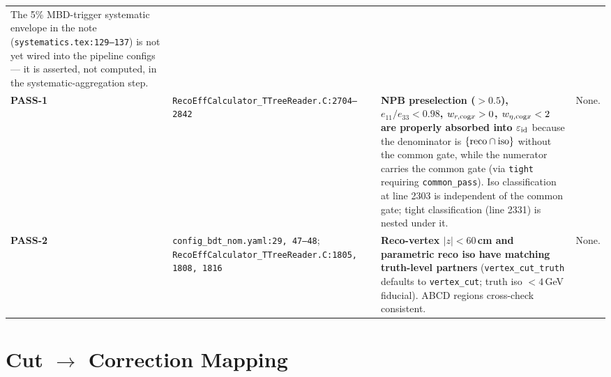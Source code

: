 \documentclass[11pt,a4paper]{article}
\newcommand{\ok}[1]{\textcolor{green!50!black}{\textbf{#1}}}
\begin{document}
\begin{longtable}{@{}p{1.9cm}p{4.8cm}p{5.8cm}p{4.3cm}@{}}
The 5\% MBD-trigger systematic envelope in the note
(\texttt{systematics.tex:129--137}) is not yet wired into the pipeline
configs --- it is asserted, not computed, in the systematic-aggregation
step. \\
\addlinespace
\ok{PASS-1} &
\texttt{RecoEffCalculator\_TTreeReader.C:2704--2842} &
\ok{NPB preselection ($> 0.5$), $e_{11}/e_{33} < 0.98$,
$w_{r,{\rm cog}x} > 0$, $w_{\eta,{\rm cog}x} < 2$ are properly absorbed
into $\varepsilon_{\rm id}$} because the denominator is
$\{{\rm reco} \cap {\rm iso}\}$ without the common gate, while the
numerator carries the common gate (via \texttt{tight} requiring
\texttt{common\_pass}). Iso classification at line 2303 is
independent of the common gate; tight classification (line 2331) is
nested under it. & None. \\
\addlinespace
\ok{PASS-2} &
\texttt{config\_bdt\_nom.yaml:29, 47--48}; \texttt{RecoEffCalculator\_TTreeReader.C:1805, 1808, 1816} &
\ok{Reco-vertex $|z|<60$\,cm and parametric reco iso have matching
truth-level partners} (\texttt{vertex\_cut\_truth} defaults to
\texttt{vertex\_cut}; truth iso $<4$\,GeV fiducial). ABCD regions
cross-check consistent. & None. \\
\bottomrule
\end{longtable}

\section{Cut $\rightarrow$ Correction Mapping}
\end{document}
